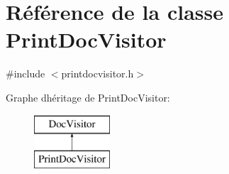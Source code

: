\hypertarget{class_print_doc_visitor}{}\section{Référence de la classe Print\+Doc\+Visitor}
\label{class_print_doc_visitor}


{\ttfamily \#include $<$printdocvisitor.\+h$>$}

Graphe d\textquotesingle{}héritage de Print\+Doc\+Visitor\+:\begin{figure}[H]
\begin{center}
\leavevmode
\includegraphics[height=2.000000cm]{class_print_doc_visitor}
\end{center}
\end{figure}
